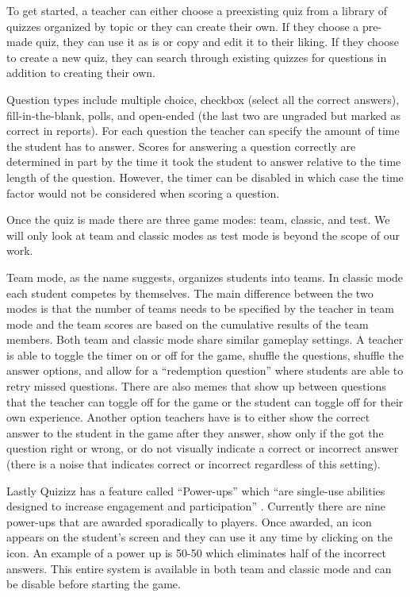 \documentclass{article}
\begin{document}
        To get started, a teacher can either choose a preexisting quiz from a library of quizzes organized by topic or they can create their own. If they choose a pre-made quiz, they can use it as is or copy and edit it to their liking. If they choose to create a new quiz, they can search through existing quizzes for questions in addition to creating their own.
        \smallskip
        
        Question types include multiple choice, checkbox (select all the correct answers), fill-in-the-blank, polls, and open-ended (the last two are ungraded but marked as correct in reports). For each question the teacher can specify the amount of time the student has to answer. Scores for answering a question correctly are determined in part by the time it took the student to answer relative to the time length of the question. However, the timer can be disabled in which case the time factor would not be considered when scoring a question.
        \smallskip
        
        Once the quiz is made there are three game modes: team, classic, and test. We will only look at team and classic modes as test mode is beyond the scope of our work.
        \smallskip
        
        Team mode, as the name suggests, organizes students into teams. In classic mode each student competes by themselves. The main difference between the two modes is that the number of teams needs to be specified by the teacher in team mode and the team scores are based on the cumulative results of the team members. Both team and classic mode share similar gameplay settings. A teacher is able to toggle the timer on or off for the game, shuffle the questions, shuffle the answer options, and allow for a ``redemption question'' where students are able to retry missed questions. There are also memes that show up between questions that the teacher can toggle off for the game or the student can toggle off for their own experience. Another option teachers have is to either show the correct answer to the student in the game after they answer, show only if the got the question right or wrong, or do not visually indicate a correct or incorrect answer (there is a noise that indicates correct or incorrect regardless of this setting).
        \smallskip
        
        Lastly Quizizz has a feature called ``Power-ups'' which ``are single-use abilities designed to increase engagement and participation'' \cite{quizizz}. Currently there are nine power-ups that are awarded sporadically to players. Once awarded, an icon appears on the student's screen and they can use it any time by clicking on the icon. An example of a power up is 50-50 which eliminates half of the incorrect answers. This entire system is available in both team and classic mode and can be disable before starting the game.
        \smallskip
        
\end{document}
